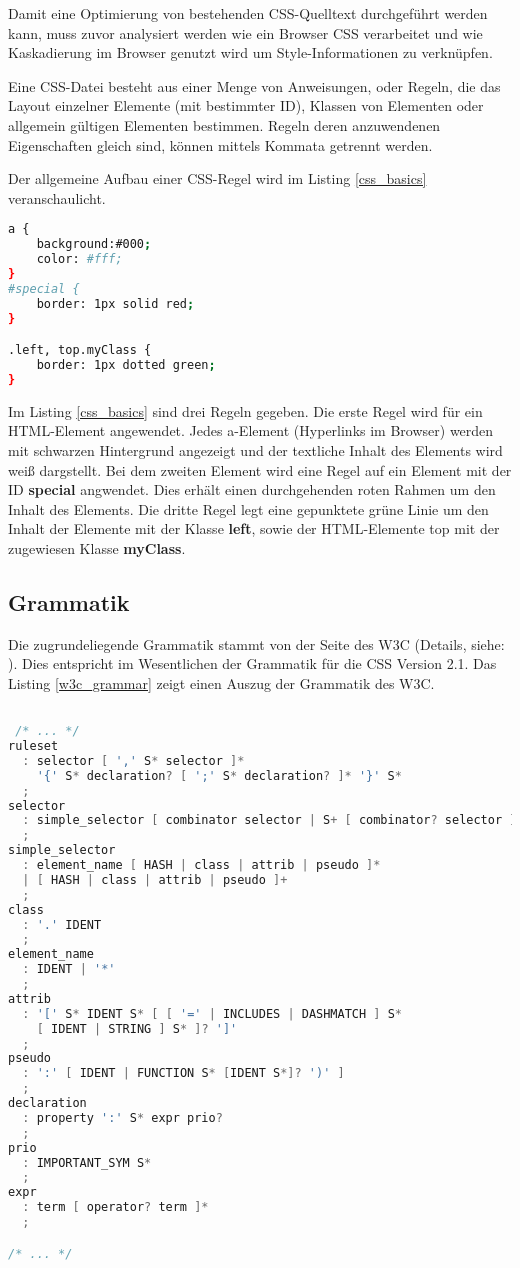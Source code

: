 Damit eine Optimierung von bestehenden CSS-Quelltext durchgeführt werden kann, muss zuvor analysiert werden wie ein Browser CSS verarbeitet und wie Kaskadierung im Browser genutzt wird um Style-Informationen zu verknüpfen.

Eine CSS-Datei besteht aus einer Menge von Anweisungen, oder Regeln, die das Layout einzelner Elemente (mit bestimmter ID), Klassen von Elementen oder allgemein gültigen Elementen bestimmen. Regeln deren anzuwendenen Eigenschaften gleich sind, können mittels Kommata getrennt werden.

Der allgemeine Aufbau einer CSS-Regel wird im Listing \ref{css_basics} veranschaulicht.   

\begin{lstlisting}[label=css_basics,language=bash, caption=Aufbau einer CSS-Regel]
a {
    background:#000;
    color: #fff;
}  
#special {
    border: 1px solid red;
}

.left, top.myClass {
    border: 1px dotted green;
}
\end{lstlisting}

Im Listing \ref{css_basics} sind drei Regeln gegeben. Die erste Regel wird für ein HTML-Element angewendet. Jedes a-Element (Hyperlinks im Browser) werden mit schwarzen Hintergrund angezeigt und der textliche Inhalt des Elements wird weiß dargstellt. Bei dem zweiten Element wird eine Regel auf ein Element mit der ID \textbf{special} angwendet. Dies erhält einen durchgehenden roten Rahmen um den Inhalt des Elements. Die dritte Regel legt eine gepunktete grüne Linie um den Inhalt der Elemente mit der Klasse \textbf{left}, sowie der HTML-Elemente top mit der zugewiesen Klasse \textbf{myClass}.  

\subsection{Grammatik}

Die zugrundeliegende Grammatik stammt von der Seite des W3C (Details, siehe: \cite{w3c_css_grammar}). Dies entspricht im Wesentlichen der Grammatik für die CSS Version 2.1. Das Listing \ref{w3c_grammar} zeigt einen Auszug der Grammatik des W3C. 

\begin{lstlisting}[label=w3c_grammar,language=C, caption=Grammatik des W3C]

 /* ... */
ruleset
  : selector [ ',' S* selector ]*
    '{' S* declaration? [ ';' S* declaration? ]* '}' S*
  ;
selector
  : simple_selector [ combinator selector | S+ [ combinator? selector ]? ]?
  ;
simple_selector
  : element_name [ HASH | class | attrib | pseudo ]*
  | [ HASH | class | attrib | pseudo ]+
  ;
class
  : '.' IDENT
  ;
element_name
  : IDENT | '*'
  ;
attrib
  : '[' S* IDENT S* [ [ '=' | INCLUDES | DASHMATCH ] S*
    [ IDENT | STRING ] S* ]? ']'
  ;
pseudo
  : ':' [ IDENT | FUNCTION S* [IDENT S*]? ')' ]
  ;
declaration
  : property ':' S* expr prio?
  ;
prio
  : IMPORTANT_SYM S*
  ;
expr
  : term [ operator? term ]*
  ;

/* ... */

\end{lstlisting}

